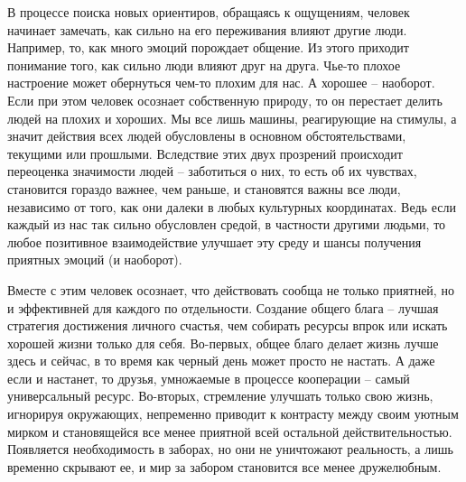 \documentclass[12pt,a4paper]{report}
\begin{document}
\noindent В процессе поиска новых ориентиров, обращаясь к ощущениям, человек начинает замечать, как сильно на его переживания влияют другие люди. Например, то, как много эмоций порождает общение. Из этого приходит понимание того, как сильно люди влияют друг на друга. Чье-то плохое настроение может обернуться чем-то плохим для нас. А хорошее -- наоборот. Если при этом человек осознает собственную природу, то он перестает делить людей на плохих и хороших. Мы все лишь машины, реагирующие на стимулы, а значит действия всех людей обусловлены в основном обстоятельствами, текущими или прошлыми. Вследствие этих двух прозрений происходит переоценка значимости людей -- заботиться о них, то есть об их чувствах, становится гораздо важнее, чем раньше, и становятся важны все люди, независимо от того, как они далеки в любых культурных координатах. Ведь если каждый из нас так сильно обусловлен средой, в частности другими людьми, то любое позитивное взаимодействие улучшает эту среду и шансы получения приятных эмоций (и наоборот).

\noindent Вместе с этим человек осознает, что действовать сообща не только приятней, но и эффективней для каждого по отдельности. Создание общего блага -- лучшая стратегия достижения личного счастья, чем собирать ресурсы впрок или искать хорошей жизни только для себя. Во-первых, общее благо делает жизнь лучше здесь и сейчас, в то время как черный день может просто не настать. А даже если и настанет, то друзья, умножаемые в процессе кооперации -- самый универсальный ресурс. Во-вторых, стремление улучшать только свою жизнь, игнорируя окружающих, непременно приводит к контрасту между своим уютным мирком и становящейся все менее приятной всей остальной действительностью. Появляется необходимость в заборах, но они не уничтожают реальность, а лишь временно скрывают ее, и мир за забором становится все менее дружелюбным.
\end{document}
